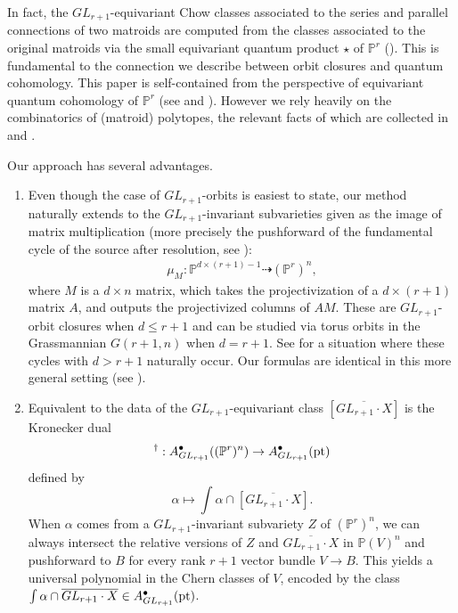 \documentclass[12pt]{amsart}
\newcommand{\mb}{\mathbb}
\newcommand{\pt}{{\rm pt}}
\theoremstyle{plain}
\theoremstyle{definition}
\theoremstyle{remark}
\begin{document}
In fact, the $GL_{r+1}$-equivariant Chow classes associated to the series and parallel connections of two matroids are computed from the classes associated to the original matroids via the small equivariant quantum product $\star$ of $\mb{P}^r$ (). This is fundamental to the connection we describe between orbit closures and quantum cohomology. This paper is self-contained from the perspective of equivariant quantum cohomology of $\mb{P}^r$ (see  and ). However we rely heavily on the combinatorics of (matroid) polytopes, the relevant facts of which are collected in  and . 



Our approach has several advantages. 
\begin{enumerate}
    \item Even though the case of $GL_{r+1}$-orbits is easiest to state, our method naturally extends to the $GL_{r+1}$-invariant subvarieties given as the image of matrix multiplication (more precisely the pushforward of the fundamental cycle of the source after resolution, see ):
    \begin{align*}
        \mu_M: \mb{P}^{d\times (r+1)-1}\dashrightarrow (\mb{P}^r)^n,
    \end{align*}
    where $M$ is a $d\times n$ matrix, which takes the projectivization of a $d\times (r+1)$ matrix $A$, and outputs the projectivized columns of $AM$. These are $GL_{r+1}$-orbit closures when $d\leq r+1$ and can be studied via torus orbits in the Grassmannian $G(r+1,n)$ when $d=r+1$. See  for a situation where these cycles with $d>r+1$ naturally occur. Our formulas are identical in this more general setting (see ).
    \item Equivalent to the data of the $GL_{r+1}$-equivariant class $[\overline{GL_{r+1}\cdot X}]$ is the Kronecker dual
    \begin{align*}
        [\overline{GL_{r+1}\cdot X}]^{\dagger}: A_{GL_{r+1}}^{\bullet}((\mb{P}^r)^n)\to A_{GL_{r+1}}^{\bullet}(\pt)
    \end{align*}
   defined by $$\alpha\mapsto \int\alpha\cap [\overline{GL_{r+1}\cdot X}].$$ When $\alpha$ comes from a $GL_{r+1}$-invariant subvariety $Z$ of $(\mb{P}^r)^n$, we can always intersect the relative versions of $Z$ and $\overline{GL_{r+1}\cdot X}$ in $\mb{P}(V)^n$ and pushforward to $B$ for every rank $r+1$ vector bundle $V\to B$. This yields a universal polynomial in the Chern classes of $V$, encoded by the class $\int\alpha\cap \overline{GL_{r+1}\cdot X}\in A^\bullet_{GL_{r+1}}(\pt)$.
   

\end{enumerate}
\end{document}
